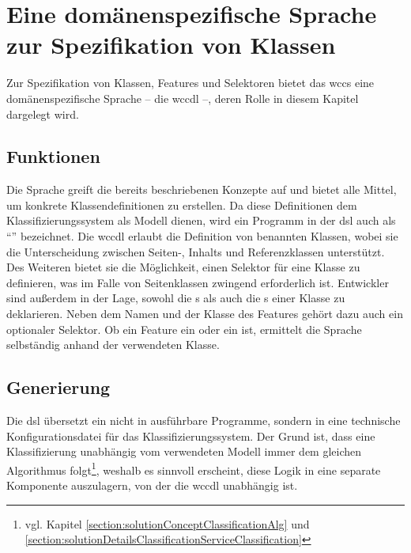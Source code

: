 \section{Eine domänenspezifische Sprache zur Spezifikation von Klassen}
    Zur Spezifikation von Klassen, Features und Selektoren bietet das
    \gls{wccs} eine domänenspezifische Sprache
    -- die \gls{wccdl} --,
    deren Rolle in diesem Kapitel dargelegt wird.

    \subsection{Funktionen}
        Die Sprache greift die bereits beschriebenen
        Konzepte
        auf und bietet alle Mittel, um konkrete Klassendefinitionen zu erstellen.
        Da diese Definitionen dem Klassifizierungssystem als Modell dienen,
        wird ein Programm in der \gls{dsl} auch als "`{\classificationModel}"' bezeichnet.
        Die \gls{wccdl} erlaubt die Definition von benannten Klassen,
        wobei sie die Unterscheidung zwischen Seiten-, Inhalts und Referenzklassen unterstützt.
        Des Weiteren bietet sie die Möglichkeit, einen Selektor für eine Klasse zu definieren,
        was im Falle von Seitenklassen zwingend erforderlich ist.
        Entwickler sind außerdem in der Lage, sowohl die {\scalarFeature}s
        als auch die {\collectionFeature}s einer Klasse zu deklarieren.
        Neben dem Namen und der Klasse des Features gehört dazu auch ein optionaler Selektor.
        Ob ein Feature ein {\contentFeature} oder ein {} ist,
        ermittelt die Sprache selbständig anhand der verwendeten Klasse.

    \subsection{Generierung}
        \label{section:conceptDslGeneration}
        Die \gls{dsl} übersetzt ein {\classificationModel} nicht in ausführbare Programme,
        sondern in eine technische Konfigurationsdatei für das Klassifizierungssystem.
        Der Grund ist, dass eine Klassifizierung unabhängig vom verwendeten Modell immer
        dem gleichen Algorithmus
        folgt\footnote{vgl. Kapitel \ref{section:solutionConceptClassificationAlg}
        und \ref{section:solutionDetailsClassificationServiceClassification}},
        weshalb es sinnvoll erscheint, diese Logik in eine separate Komponente auszulagern,
        von der die \gls{wccdl} unabhängig ist.

